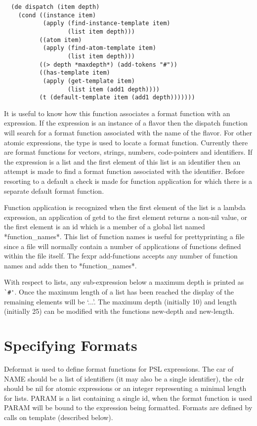 \begin{verbatim}
  (de dispatch (item depth)
    (cond ((instance item)
           (apply (find-instance-template item)
                  (list item depth)))
          ((atom item)
           (apply (find-atom-template item)
                  (list item depth)))
          ((> depth *maxdepth*) (add-tokens "#"))
          ((has-template item)
           (apply (get-template item)
                  (list item (add1 depth))))
          (t (default-template item (add1 depth)))))))
\end{verbatim}
  It is useful to know how this  function  associates  a  format
function with an expression. If the expression is an instance of
a  flavor  then  the  dispatch function will search for a format
function associated with the name  of  the  flavor.   For  other
atomic  expressions,  the  type  is  used  to  locate  a  format
function.  Currently there are  format  functions  for  vectors,
strings,   numbers,  code-pointers  and  identifiers.    If  the
expression is a list and the first element of this  list  is  an
identifier  then  an  attempt  is made to find a format function
associated with the identifier. Before resorting to a default  a
check  is  made  for  function  application for which there is a
separate default format function.

  Function application is recognized when the first  element  of
the  list  is a lambda expression, an application of getd to the
first element returns a non-nil value, or the first  element  is
an id which is a member of a global list named *function\_names*.
This  list of function names is useful for prettyprinting a file
since a file will normally contain a number of  applications  of
functions   defined   within   the   file  itself.    The  fexpr
add-functions accepts any number of function names and adds then
to *function\_names*.


  With respect to lists, any  sub-expression  below  a  maximum
depth  is printed as \verb$`#'$.  Once the maximum length of a list
has been reached the display  of  the  remaining  elements  will 
be `...'.    The maximum depth (initially 10) and length (initially
25) can be modified with the functions new-depth and new-length.

\section{Specifying Formats}


{    
Deformat  is  used  to  define  format  functions 
for   PSL
    expressions.    The   car  of  NAME  should  be  a  list  of
    identifiers (it may also be a single  identifier),  the  cdr
    should   be   nil  for  atomic  expressions  or  an  integer
    representing a minimal length for lists.  PARAM  is  a  list
    containing  a  single  id,  when the format function is used
    PARAM will be  bound  to  the  expression  being  formatted.
    Formats are defined by calls on template (described below).
}

